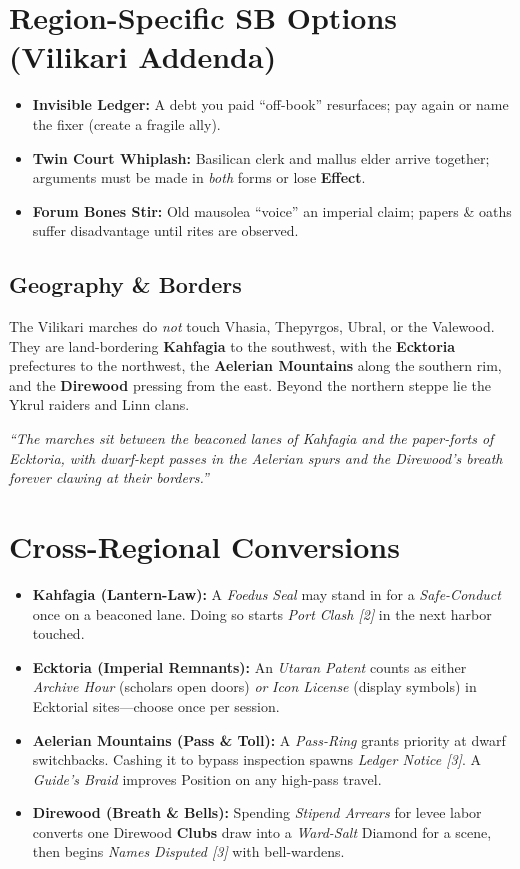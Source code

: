 \section*{Region-Specific SB Options (Vilikari Addenda)}
\begin{itemize}
\item \textbf{Invisible Ledger:} A debt you paid “off-book” resurfaces; pay again or name the fixer (create a fragile ally).
\item \textbf{Twin Court Whiplash:} Basilican clerk and mallus elder arrive together; arguments must be made in \emph{both} forms or lose \textbf{Effect}.
\item \textbf{Forum Bones Stir:} Old mausolea “voice” an imperial claim; papers \& oaths suffer disadvantage until rites are observed.
\end{itemize}

\subsection*{Geography \& Borders}
The Vilikari marches do \emph{not} touch Vhasia, Thepyrgos, Ubral, or the Valewood.  
They are land-bordering \textbf{Kahfagia} to the southwest, with the \textbf{Ecktoria} prefectures to the northwest, the \textbf{Aelerian Mountains} along the southern rim, and the \textbf{Direwood} pressing from the east.  
Beyond the northern steppe lie the Ykrul raiders and Linn clans.  

\emph{“The marches sit between the beaconed lanes of Kahfagia and the paper-forts of Ecktoria, with dwarf-kept passes in the Aelerian spurs and the Direwood’s breath forever clawing at their borders.”}

\section*{Cross-Regional Conversions}
\begin{itemize}
  \item \textbf{Kahfagia (Lantern-Law):} A \emph{Foedus Seal} may stand in for a \emph{Safe-Conduct} once on a beaconed lane. Doing so starts \emph{Port Clash [2]} in the next harbor touched.
  \item \textbf{Ecktoria (Imperial Remnants):} An \emph{Utaran Patent} counts as either \emph{Archive Hour} (scholars open doors) \emph{or} \emph{Icon License} (display symbols) in Ecktorial sites—choose once per session.
  \item \textbf{Aelerian Mountains (Pass \& Toll):} A \emph{Pass-Ring} grants priority at dwarf switchbacks. Cashing it to bypass inspection spawns \emph{Ledger Notice [3]}. A \emph{Guide’s Braid} improves Position on any high-pass travel.
  \item \textbf{Direwood (Breath \& Bells):} Spending \emph{Stipend Arrears} for levee labor converts one Direwood \textbf{Clubs} draw into a \emph{Ward-Salt} Diamond for a scene, then begins \emph{Names Disputed [3]} with bell-wardens.
\end{itemize}

